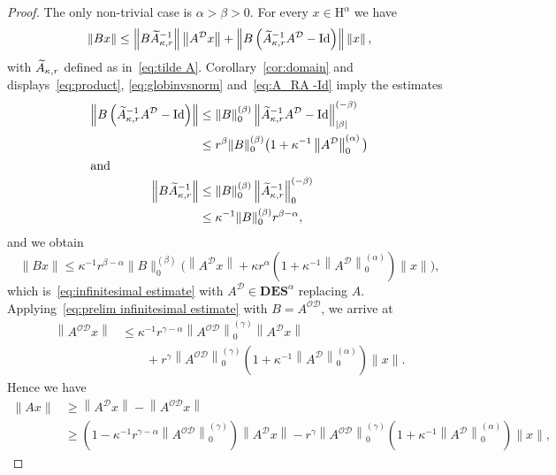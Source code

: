 \documentclass[AHL,Unicode,longabstracts,published]{cedram}
\DeclareMathOperator{\Id}{Id}
\renewcommand{\mathsf}{\mathrm}
\newcommand{\sfH}{\mathsf{H}}
\newcommand{\CD}{\mathcal{D}}
\newcommand{\CO}{\mathcal{O}}
\newcommand{\BD}{\mathbf D}
\newcommand{\BE}{\mathbf E}
\newcommand{\BS}{\mathbf S}
\newcommand{\norm}[1]{\left\| #1 \right\|}
\newcommand{\er}{r}
\let\oldtilde\tilde
\renewcommand*{\tilde}[1]{\mathchoice{\widetilde{#1}}{\widetilde{#1}}{\oldtilde{#1}}{\oldtilde{#1}}}
\begin{document}
\begin{proof}
The only non-trivial case is $\alpha >\beta >0$. For every $x\in\sfH^\alpha$ we have
\begin{equation*}
\|Bx\| \le \left\|B\tilde A_{\kappa,\er}^{-1}\right\|\norm{A^\CD x} +\left\|B\left(\tilde A_{\kappa,\er}^{-1}A^\CD -\Id\right)\right\|\norm{x},
\end{equation*}
with $\tilde A_{\kappa,\er}$ defined as in~\eqref{eq:tilde A}. Corollary~\ref{cor:domain} and displays~\eqref{eq:product}, \eqref{eq:globinvsnorm} and~\eqref{eq:A_RA -Id} imply the estimates
\begin{align*}
\left\|B\left(\tilde A_{\kappa,\er}^{-1}A^\CD -\Id\right)\right\| &\le
\|B\|_0^{(\beta)}\left\|\tilde A_{\kappa,\er}^{-1}A^\CD -\Id\right\|_{|\beta|}^{(-\beta)}\\
&\le \er^\beta\|B\|_0^{(\beta)}\big(1 +\kappa^{-1}\left\|A^\CD\right\|_0^{(\alpha)}\big)
\\
\intertext{and}
\left\|B\tilde A_{\kappa,\er}^{-1}\right\| &\le \|B\|_0^{(\beta)}\left\|\tilde A_{\kappa,\er}^{-1}\right\|_0^{(-\beta)}\\ &\le \kappa^{-1}\|B\|_0^{(\beta)}\er^{\beta -\alpha},
\end{align*}
and we obtain
\begin{equation}\label{eq:prelim infinitesimal estimate}
\|Bx\| \le \kappa^{-1}\er^{\beta -\alpha}\|B\|_0^{(\beta)}\Big(\left\|A^\CD x\right\| +\kappa \er^\alpha\left(1 +\kappa^{-1}\left\|A^\CD\right\|_0^{(\alpha)}\right)\|x\|\Big),
\end{equation}
which is~\eqref{eq:infinitesimal estimate} with $A^\CD\in \BD\BE\BS^\alpha$ replacing $A$. Applying~\eqref{eq:prelim infinitesimal estimate} with $B=A^{\CO\CD}$, we arrive at
\begin{equation}
\begin{aligned}
\left\|A^{\CO\CD}x\right\| &\le \kappa^{-1}\er^{\gamma -\alpha}\left\|A^{\CO\CD}\right\|_0^{(\gamma)}\left\|A^\CD x\right\|  \\ &\qquad +\er^\gamma\left\|A^{\CO\CD}\right\|_0^{(\gamma)}\left(1 +\kappa^{-1}\left\|A^\CD\right\|_0^{(\alpha)}\right)\|x\|.
\end{aligned}
\end{equation}
Hence we have
\begin{align*}
\|Ax\| &\ge \left\|A^\CD x\right\| -\left\|A^{\CO\CD}x\right\|\\
&\ge \left(1 -\kappa^{-1}\er^{\gamma -\alpha}\left\|A^{\CO\CD}\right\|_0^{(\gamma)}\right)\left\|A^\CD x\right\| -\er^\gamma\left\|A^{\CO\CD}\right\|_0^{(\gamma)}\left(1 +\kappa^{-1}\left\|A^\CD\right\|_0^{(\alpha)}\right)\|x\|,

\end{align*}
\end{proof}
\end{document}
